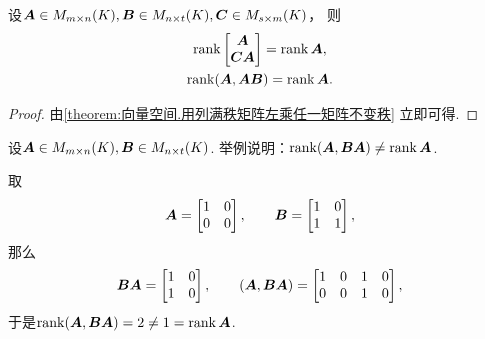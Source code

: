 \begin{corollary}\label{theorem:西尔维斯特不等式.分块矩阵的秩的等式3}
设\(\boldsymbol{A} \in M_{m \times n}(K),
\boldsymbol{B} \in M_{n \times t}(K),
\boldsymbol{C} \in M_{s \times m}(K)\)，
则\begin{gather*}
	\rank\begin{bmatrix}
		\boldsymbol{A} \\
		\boldsymbol{C} \boldsymbol{A}
	\end{bmatrix}
	= \rank\boldsymbol{A}, \\
	\rank(\boldsymbol{A},\boldsymbol{A} \boldsymbol{B})
	= \rank\boldsymbol{A}.
\end{gather*}
\begin{proof}
由\cref{theorem:向量空间.用列满秩矩阵左乘任一矩阵不变秩} 立即可得.
\end{proof}
\end{corollary}
\begin{example}
设\(\boldsymbol{A} \in M_{m \times n}(K),
\boldsymbol{B} \in M_{n \times t}(K)\).
举例说明：\(\rank(\boldsymbol{A},\boldsymbol{B} \boldsymbol{A}) \neq \rank\boldsymbol{A}\).
\begin{solution}
取\[
	\boldsymbol{A} = \begin{bmatrix}
		1 & 0 \\
		0 & 0
	\end{bmatrix},
	\qquad
	\boldsymbol{B} = \begin{bmatrix}
		1 & 0 \\
		1 & 1
	\end{bmatrix},
\]
那么\[
	\boldsymbol{B} \boldsymbol{A} = \begin{bmatrix}
		1 & 0 \\
		1 & 0
	\end{bmatrix},
	\qquad
	(\boldsymbol{A},\boldsymbol{B} \boldsymbol{A}) = \begin{bmatrix}
		1 & 0 & 1 & 0 \\
		0 & 0 & 1 & 0
	\end{bmatrix},
\]
于是\(\rank(\boldsymbol{A},\boldsymbol{B} \boldsymbol{A}) = 2 \neq 1 = \rank\boldsymbol{A}\).
\end{solution}
\end{example}
